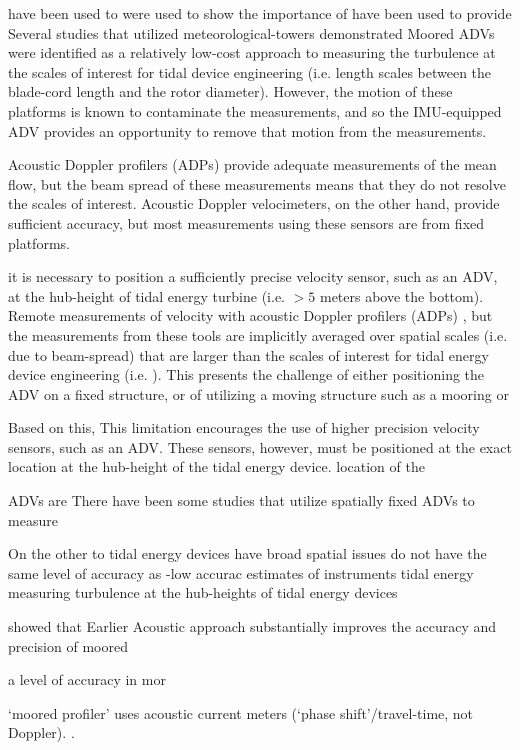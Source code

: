 have been used to were used to show the importance of  have been used to provide Several studies that utilized meteorological-towers  demonstrated Moored ADVs were identified as a relatively low-cost approach to measuring the turbulence at the scales of interest for tidal device engineering (i.e. length scales between the blade-cord length and the rotor diameter). However, the motion of these platforms is known to contaminate the measurements, and so the IMU-equipped ADV provides an opportunity to remove that motion from the measurements.

Acoustic Doppler profilers (ADPs) provide adequate measurements of the mean flow, but the beam spread of these measurements means that they do not resolve the scales of interest. Acoustic Doppler velocimeters, on the other hand, provide sufficient accuracy, but most measurements using these sensors are from fixed platforms. 

it is necessary to position a sufficiently precise velocity sensor, such as an ADV, at the hub-height of tidal energy turbine (i.e. $>5$ meters above the bottom). 
Remote measurements of velocity with acoustic Doppler profilers (ADPs) , but the measurements from these tools are implicitly averaged over spatial scales (i.e. due to beam-spread) that are larger than the scales of interest for tidal energy device engineering (i.e. ). This presents the challenge of either positioning the ADV on a fixed structure, or of utilizing a moving structure such as a mooring or 


Based on this, This limitation encourages the use of higher precision velocity sensors, such as an ADV. These sensors, however, must be positioned at the exact location  at the hub-height of the tidal energy device.  location of the 

ADVs are There have been some  studies that utilize spatially fixed ADVs to measure 

On the other to tidal energy devices have broad spatial  issues do not have the same level of accuracy as -low accurac estimates of instruments tidal energy measuring turbulence at the hub-heights of tidal energy devices

showed that Earlier Acoustic approach substantially improves the accuracy and precision of moored 

a level of accuracy in mor

\cite[]{Doherty++1999} `moored profiler' uses acoustic current meters (`phase shift'/travel-time, not Doppler). \cite[]{Nash++2004, Alford2010}.

